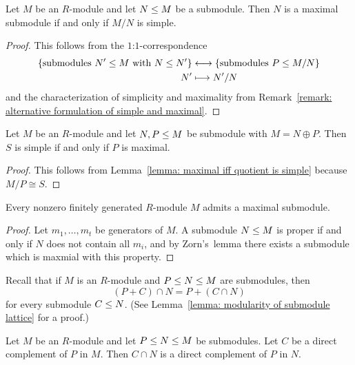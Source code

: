 \begin{lemma}
  \label{lemma: maximal iff quotient is simple}
  Let $M$ be an $R$-module and let $N \leq M$ be a submodule.
  Then $N$ is a maximal submodule if and only if $M/N$ is simple.
\end{lemma}


\begin{proof}
  This follows from the $1$:$1$-correspondence
  \begin{align*}
    \{ \text{submodules $N' \leq M$ with $N \leq N'$} \}
    &\longleftrightarrow
    \{ \text{submodules $P \leq M/N$} \}
    \\
                  N'
    &\longmapsto  N'/N
  \end{align*}
  and the characterization of simplicity and maximality from Remark~\ref{remark: alternative formulation of simple and maximal}.
\end{proof}


\begin{corollary}
  Let $M$ be an $R$-module and let $N, P \leq M$ be submodule with $M = N \oplus P$.
  Then $S$ is simple if and only if $P$ is maximal.
\end{corollary}


\begin{proof}
  This follows from Lemma~\ref{lemma: maximal iff quotient is simple} because $M/P \cong S$.
\end{proof}


\begin{lemma}
  \label{lemma: fg modules contain max submodules}
  Every nonzero finitely generated $R$-module $M$ admits a maximal submodule.
\end{lemma}


\begin{proof}
  Let $m_1, \dotsc, m_t$ be generators of $M$.
  A submodule $N \leq M$ is proper if and only if $N$ does not contain all $m_i$, and by Zorn’s~lemma there exists a submodule which is maxmial with this property.
\end{proof}


\begin{fluff}
  Recall that if $M$ is an $R$-module and $P \leq N \leq M$ are submodules, then
  \[
      (P + C) \cap N
    = P + (C \cap N)
  \]
  for every submodule $C \leq N$.
  (See Lemma~\ref{lemma: modularity of submodule lattice} for a proof.)
\end{fluff}


\begin{corollary}
  \label{corollary: direct complements in submodules}
  Let $M$ be an $R$-module and let $P \leq N \leq M$ be submodules.
  Let $C$ be a direct complement of $P$ in $M$.
  Then $C \cap N$ is a direct complement of $P$ in $N$.
\end{corollary}


